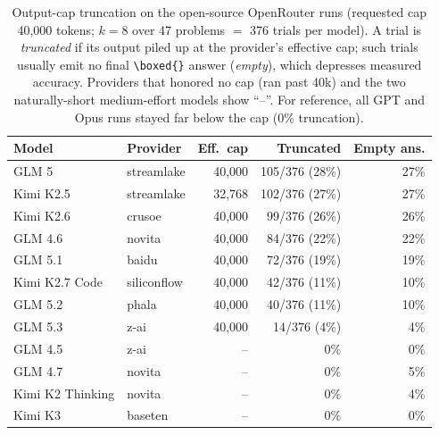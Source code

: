 \begin{table}[t]
\centering
\caption{Output-cap truncation on the open-source OpenRouter runs (requested cap 40{,}000 tokens; $k{=}8$ over 47 problems $=$ 376 trials per model). A trial is \emph{truncated} if its output piled up at the provider's effective cap; such trials usually emit no final \texttt{\textbackslash boxed\{\}} answer (\emph{empty}), which depresses measured accuracy. Providers that honored no cap (ran past 40k) and the two naturally-short medium-effort models show ``--''. For reference, all GPT and Opus runs stayed far below the cap (0\% truncation).}
\label{tab:truncation}
\begin{tabular}{llrrr}
\toprule
Model & Provider & Eff.\ cap & Truncated & Empty ans. \\
\midrule
GLM 5 & streamlake & 40{,}000 & 105/376 (28\%) & 27\% \\
Kimi K2.5 & streamlake & 32{,}768 & 102/376 (27\%) & 27\% \\
Kimi K2.6 & crusoe & 40{,}000 & 99/376 (26\%) & 26\% \\
GLM 4.6 & novita & 40{,}000 & 84/376 (22\%) & 22\% \\
GLM 5.1 & baidu & 40{,}000 & 72/376 (19\%) & 19\% \\
Kimi K2.7 Code & siliconflow & 40{,}000 & 42/376 (11\%) & 10\% \\
GLM 5.2 & phala & 40{,}000 & 40/376 (11\%) & 10\% \\
GLM 5.3 & z-ai & 40{,}000 & 14/376 (4\%) & 4\% \\
GLM 4.5 & z-ai & -- & 0\% & 0\% \\
GLM 4.7 & novita & -- & 0\% & 5\% \\
Kimi K2 Thinking & novita & -- & 0\% & 4\% \\
Kimi K3 & baseten & -- & 0\% & 0\% \\
\bottomrule
\end{tabular}
\end{table}
